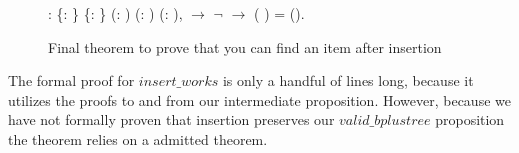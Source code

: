 \begin{figure}
  \begin{coqdoccode}
  \coqdocnoindent
   : \coqdockw{\ensuremath{\forall}} \{: \} \{: \} (: ) (: ) (:   ),\coqdoceol
  \coqdocindent{1.00em}
      \ensuremath{\rightarrow}\coqdoceol
  \coqdocindent{1.00em}
  \ensuremath{\lnot}    \ensuremath{\rightarrow}\coqdoceol
  \coqdocindent{1.00em}
    (   ) =  ().\coqdoceol
  \end{coqdoccode}
  \caption{Final theorem to prove that you can find an item after insertion}
  \label{fig:insert_works}
\end{figure}

The formal proof for $insert\_works$ is only a handful of lines long, because it utilizes the proofs to and from our intermediate proposition. However, because we have not formally proven that insertion preserves our $valid\_bplustree$ proposition the theorem relies on a admitted theorem.
